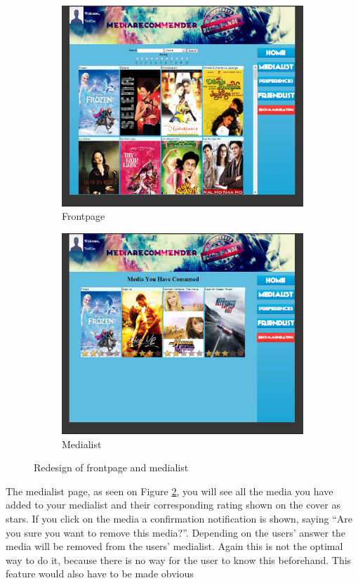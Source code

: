 \begin{figure}[H]
\centering
\begin{subfigure}{.5\textwidth}
  \centering
  \includegraphics[width=.9\linewidth]{Images/new-home.jpg}
  \caption{Frontpage}
  \label{fig:new-frontpage}
\end{subfigure}%
\begin{subfigure}{.5\textwidth}
  \centering
  \includegraphics[width=.9\linewidth]{Images/new-medialist.jpg}
  \caption{Medialist}
  \label{fig:new-medialist}
\end{subfigure}
\caption{Redesign of frontpage and medialist}
\label{fig:front-media}
\end{figure}

The medialist page, as seen on Figure \ref{fig:new-medialist}, you will see all the media you have added to your medialist and their corresponding rating shown on the cover as stars. If you click on the media a confirmation notification is shown, saying “Are you sure you want to remove this media?”. Depending on the users' answer the media will be removed from the users' medialist. Again this is not the optimal way to do it, because there is no way for the user to know this beforehand. This feature would also have to be made obvious

